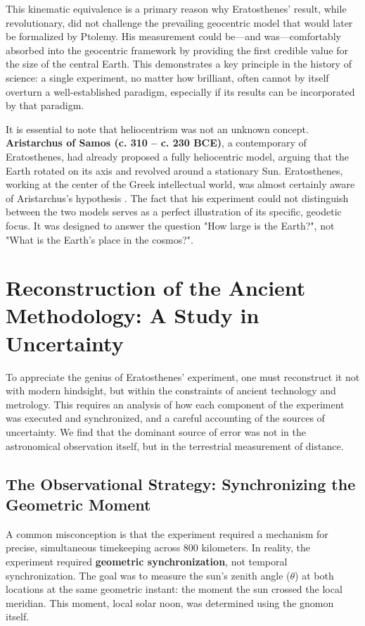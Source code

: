 \documentclass[11pt]{article}
\begin{document}
This kinematic equivalence is a primary reason why Eratosthenes' result, while revolutionary, did not challenge the prevailing geocentric model that would later be formalized by Ptolemy. His measurement could be—and was—comfortably absorbed into the geocentric framework by providing the first credible value for the size of the central Earth. This demonstrates a key principle in the history of science: a single experiment, no matter how brilliant, often cannot by itself overturn a well-established paradigm, especially if its results can be incorporated by that paradigm.

It is essential to note that heliocentrism was not an unknown concept. \textbf{Aristarchus of Samos (c. 310 – c. 230 BCE)}, a contemporary of Eratosthenes, had already proposed a fully heliocentric model, arguing that the Earth rotated on its axis and revolved around a stationary Sun. Eratosthenes, working at the center of the Greek intellectual world, was almost certainly aware of Aristarchus's hypothesis \cite{Heath1913}. The fact that his experiment could not distinguish between the two models serves as a perfect illustration of its specific, geodetic focus. It was designed to answer the question "How large is the Earth?", not "What is the Earth's place in the cosmos?".

\section{Reconstruction of the Ancient Methodology: A Study in Uncertainty}

To appreciate the genius of Eratosthenes' experiment, one must reconstruct it not with modern hindsight, but within the constraints of ancient technology and metrology. This requires an analysis of how each component of the experiment was executed and synchronized, and a careful accounting of the sources of uncertainty. We find that the dominant source of error was not in the astronomical observation itself, but in the terrestrial measurement of distance.

\subsection{The Observational Strategy: Synchronizing the Geometric Moment}

A common misconception is that the experiment required a mechanism for precise, simultaneous timekeeping across 800 kilometers. In reality, the experiment required \textbf{geometric synchronization}, not temporal synchronization. The goal was to measure the sun's zenith angle ($\theta$) at both locations at the same geometric instant: the moment the sun crossed the local meridian. This moment, local solar noon, was determined using the gnomon itself.
\end{document}
